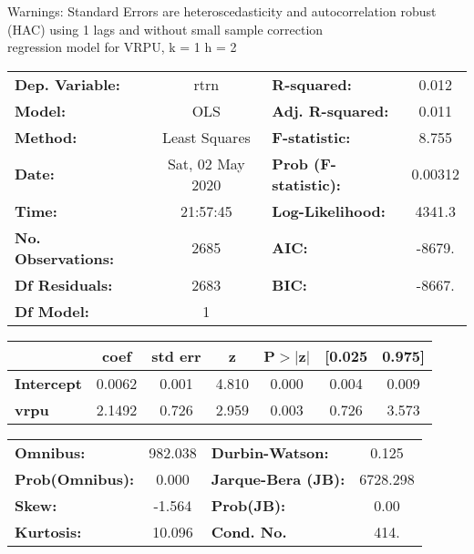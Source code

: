 Warnings: \newline
 [1] Standard Errors are heteroscedasticity and autocorrelation robust (HAC) using 1 lags and without small sample correction\\ 

regression model for VRPU, k = 1 h = 2\begin{center}
\begin{tabular}{lclc}
\toprule
\textbf{Dep. Variable:}    &       rtrn       & \textbf{  R-squared:         } &     0.012   \\
\textbf{Model:}            &       OLS        & \textbf{  Adj. R-squared:    } &     0.011   \\
\textbf{Method:}           &  Least Squares   & \textbf{  F-statistic:       } &     8.755   \\
\textbf{Date:}             & Sat, 02 May 2020 & \textbf{  Prob (F-statistic):} &  0.00312    \\
\textbf{Time:}             &     21:57:45     & \textbf{  Log-Likelihood:    } &    4341.3   \\
\textbf{No. Observations:} &        2685      & \textbf{  AIC:               } &    -8679.   \\
\textbf{Df Residuals:}     &        2683      & \textbf{  BIC:               } &    -8667.   \\
\textbf{Df Model:}         &           1      & \textbf{                     } &             \\
\bottomrule
\end{tabular}
\begin{tabular}{lcccccc}
                   & \textbf{coef} & \textbf{std err} & \textbf{z} & \textbf{P$> |$z$|$} & \textbf{[0.025} & \textbf{0.975]}  \\
\midrule
\textbf{Intercept} &       0.0062  &        0.001     &     4.810  &         0.000        &        0.004    &        0.009     \\
\textbf{vrpu}      &       2.1492  &        0.726     &     2.959  &         0.003        &        0.726    &        3.573     \\
\bottomrule
\end{tabular}
\begin{tabular}{lclc}
\textbf{Omnibus:}       & 982.038 & \textbf{  Durbin-Watson:     } &    0.125  \\
\textbf{Prob(Omnibus):} &   0.000 & \textbf{  Jarque-Bera (JB):  } & 6728.298  \\
\textbf{Skew:}          &  -1.564 & \textbf{  Prob(JB):          } &     0.00  \\
\textbf{Kurtosis:}      &  10.096 & \textbf{  Cond. No.          } &     414.  \\
\bottomrule
\end{tabular}
\end{center}

